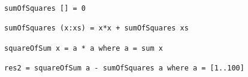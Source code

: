 \fontsize{8pt}{10pt}
\begin{verbatim}
sumOfSquares [] = 0

sumOfSquares (x:xs) = x*x + sumOfSquares xs

squareOfSum x = a * a where a = sum x

res2 = squareOfSum a - sumOfSquares a where a = [1..100]
\end{verbatim}
